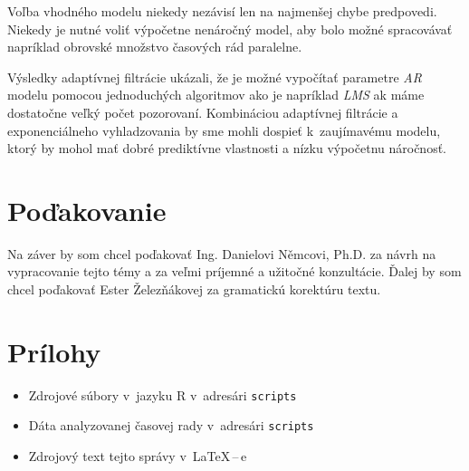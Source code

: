 \documentclass[12pt,a4paper,oneside,final]{article}
\theoremstyle{definition}
\theoremstyle{remark}
\numberwithin{equation}{section}
\begin{document}
Voľba vhodného modelu niekedy nezávisí len na najmenšej chybe predpovedi. Niekedy je nutné
voliť výpočetne nenáročný model, aby bolo možné spracovávať napríklad obrovské množstvo 
časových rád paralelne.

Výsledky adaptívnej filtrácie ukázali, že je možné vypočítať parametre \emph{AR} modelu
pomocou jednoduchých algoritmov ako je napríklad \emph{LMS} ak máme dostatočne veľký počet
pozorovaní. Kombináciou adaptívnej filtrácie a exponenciálneho vyhladzovania by sme mohli 
dospieť k~zaujímavému modelu, ktorý by mohol mať dobré prediktívne vlastnosti a nízku
výpočetnu náročnosť.

\section*{Poďakovanie}
Na záver by som chcel poďakovať Ing. Danielovi Němcovi, Ph.D. za návrh na vypracovanie
tejto témy a za veľmi príjemné a užitočné konzultácie. Ďalej by som chcel poďakovať Ester
Železňákovej za gramatickú korektúru textu.




\newpage
\renewcommand{\thesection}{\Alph{section}}
\setcounter{section}{0}
\renewcommand{\thepage}{\roman{page}}
\setcounter{page}{1}

\section{Prílohy}

\begin{itemize}
    \item Zdrojové súbory v~jazyku R v~adresári \texttt{scripts}
    \item Dáta analyzovanej časovej rady v~adresári \texttt{scripts}
    \item Zdrojový text tejto správy v~\LaTeX\,--\,e
\end{itemize}
\end{document}
